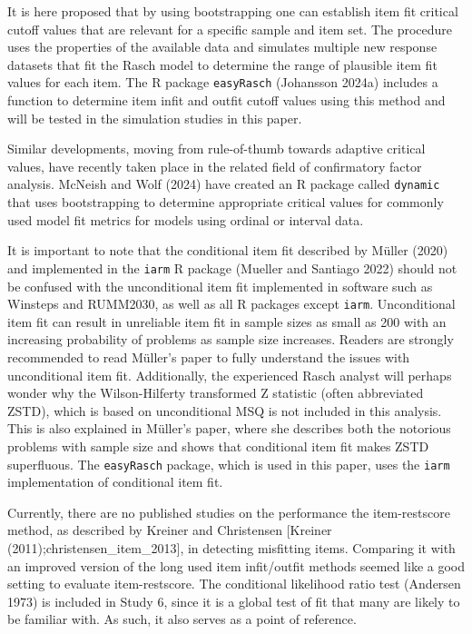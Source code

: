 \documentclass[
  letterpaper,
  DIV=11,
  numbers=noendperiod]{scrartcl}
\begin{document}
It is here proposed that by using bootstrapping one can establish item
fit critical cutoff values that are relevant for a specific sample and
item set. The procedure uses the properties of the available data and
simulates multiple new response datasets that fit the Rasch model to
determine the range of plausible item fit values for each item. The R
package \texttt{easyRasch} (Johansson 2024a) includes a function to
determine item infit and outfit cutoff values using this method and will
be tested in the simulation studies in this paper.

Similar developments, moving from rule-of-thumb towards adaptive
critical values, have recently taken place in the related field of
confirmatory factor analysis. McNeish and Wolf (2024) have created an R
package called \texttt{dynamic} that uses bootstrapping to determine
appropriate critical values for commonly used model fit metrics for
models using ordinal or interval data.

It is important to note that the conditional item fit described by
Müller (2020) and implemented in the \texttt{iarm} R package (Mueller
and Santiago 2022) should not be confused with the unconditional item
fit implemented in software such as Winsteps and RUMM2030, as well as
all R packages except \texttt{iarm}. Unconditional item fit can result
in unreliable item fit in sample sizes as small as 200 with an
increasing probability of problems as sample size increases. Readers are
strongly recommended to read Müller's paper to fully understand the
issues with unconditional item fit. Additionally, the experienced Rasch
analyst will perhaps wonder why the Wilson-Hilferty transformed Z
statistic (often abbreviated ZSTD), which is based on unconditional MSQ
is not included in this analysis. This is also explained in Müller's
paper, where she describes both the notorious problems with sample size
and shows that conditional item fit makes ZSTD superfluous. The
\texttt{easyRasch} package, which is used in this paper, uses the
\texttt{iarm} implementation of conditional item fit.

Currently, there are no published studies on the performance the
item-restscore method, as described by Kreiner and Christensen
{[}Kreiner (2011);christensen\_item\_2013{]}, in detecting misfitting
items. Comparing it with an improved version of the long used item
infit/outfit methods seemed like a good setting to evaluate
item-restscore. The conditional likelihood ratio test (Andersen 1973) is
included in Study 6, since it is a global test of fit that many are
likely to be familiar with. As such, it also serves as a point of
reference.
\end{document}
